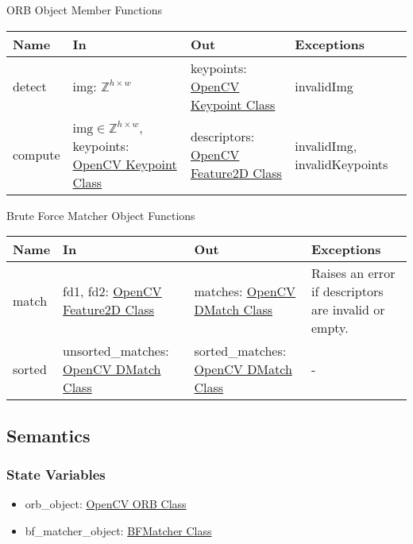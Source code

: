 \documentclass[12pt, titlepage]{article}
\begin{document}
ORB Object Member Functions
\begin{center}
\begin{tabular}{p{4cm} p{4cm} p{5cm} p{3cm}}
\hline
\textbf{Name} & \textbf{In} & \textbf{Out} & \textbf{Exceptions} \\
\hline
detect 
& img: $\mathbb{Z}^{h \times w}$ 
& keypoints: \href{https://docs.opencv.org/3.4/d2/d29/classcv_1_1KeyPoint.html}{OpenCV Keypoint Class} 
& invalidImg \\
\hline
compute & $\text{img} \in \mathbb{Z}^{h \times w}$, \newline 
keypoints: \href{https://docs.opencv.org/3.4/d2/d29/classcv_1_1KeyPoint.html}{OpenCV Keypoint Class} 
& descriptors: \href{https://docs.opencv.org/4.x/d0/d13/classcv_1_1Feature2D.html}{OpenCV Feature2D Class} 
& invalidImg, \newline 
invalidKeypoints \\
  \hline
  \end{tabular}
\end{center}
Brute Force Matcher Object Functions
\begin{center}
  \begin{tabular}{p{3cm} p{4cm} p{5cm} p{3cm}}
  \hline
  \textbf{Name} & \textbf{In} & \textbf{Out} & \textbf{Exceptions} \\
  \hline
  match & fd1, fd2: \href{https://docs.opencv.org/4.x/d0/d13/classcv_1_1Feature2D.html}{OpenCV Feature2D Class} 
  & matches: \href{https://docs.opencv.org/3.4/d4/de0/classcv_1_1DMatch.html}{OpenCV DMatch Class} 
  & Raises an error if descriptors are invalid or empty. \\
  \hline
  sorted 
  & unsorted\_matches: \href{https://docs.opencv.org/3.4/d4/de0/classcv_1_1DMatch.html}{OpenCV DMatch Class} 
  & sorted\_matches: \href{https://docs.opencv.org/3.4/d4/de0/classcv_1_1DMatch.html}{OpenCV DMatch Class} & - \\
  \hline
  \end{tabular}
\end{center}

\subsection{Semantics}

\subsubsection{State Variables}
\begin{itemize}
  \item orb\_object: \href{https://docs.opencv.org/3.4/db/d95/classcv_1_1ORB.html}{OpenCV ORB Class}
  \item bf\_matcher\_object: \href{https://docs.opencv.org/3.4/d3/da1/classcv_1_1BFMatcher.html}{BFMatcher Class}
  \end{itemize}
\end{document}
